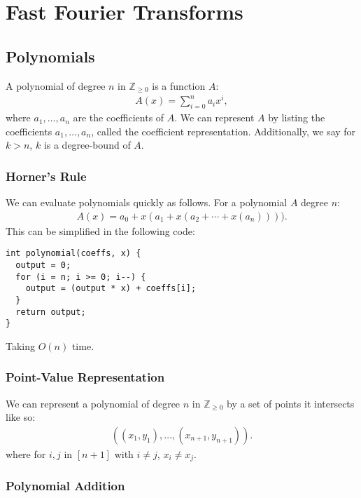 \section{Fast Fourier Transforms}

\subsection{Polynomials}

A polynomial of degree $n$ in $\mathbb{Z}_{\geq 0}$ is a function $A$: 
\begin{gather*}
  A(x) = \sum_{i = 0}^n a_ix^i,
\end{gather*} where $a_1, \ldots, a_n$ are the coefficients of $A$. 
We can represent $A$ by listing the coefficients $a_1, \ldots, a_n$, 
called the coefficient representation.
Additionally, we say for $k > n$, $k$ is a degree-bound of $A$.

\subsubsection{Horner's Rule}

We can evaluate polynomials quickly as follows.
For a polynomial $A$ degree $n$: \begin{gather*}
  A(x) = a_0 + x(a_1 + x(a_2 + \cdots + x(a_n)))).
\end{gather*} This can be simplified in the following code:
\begin{lstlisting}
int polynomial(coeffs, x) {
  output = 0;
  for (i = n; i >= 0; i--) {
    output = (output * x) + coeffs[i];
  }
  return output;
}
\end{lstlisting} Taking $O(n)$ time.

\subsubsection{Point-Value Representation}

We can represent a polynomial of degree $n$ in $\mathbb{Z}_{\geq 0}$ 
by a set of points it intersects like so:
\begin{gather*}
  ((x_1, y_1), \ldots, (x_{n + 1}, y_{n + 1})).
\end{gather*} where for $i, j$ in $[n + 1]$ with $i \neq j$, $x_i \neq x_j$. 

\subsubsection{Polynomial Addition}

